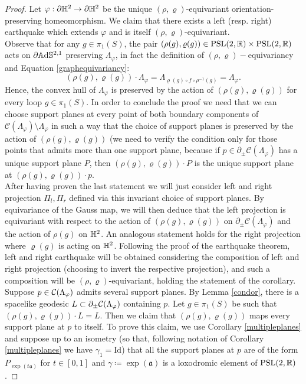 \begin{proof}
    Let $\varphi:\partial\mathbb{H}^2\to\partial\mathbb{H}^2$ be the unique $(\rho,\varrho)$-equivariant orientation-preserving homeomorphism. We claim that there exists a left (resp. right) earthquake which extends $\varphi$ and is itself $(\rho,\varrho)$-equivariant. \\
    Observe that for any $g\in \pi_1(S)$, the pair $(\rho(g),\varrho(g))\in \text{PSL}(2,\mathbb{R})\times\text{PSL}(2,\mathbb{R})$ acts on $\partial\mathbb{A}\mathrm{d}\mathbb{S}^{2,1}$ preserving $\Lambda_\varphi$, in fact the definition of $(\rho,\varrho)-$equivariancy and Equation \ref{graphequivariancy}: 
    \[
        (\rho(g),\varrho(g))\cdot\Lambda_\varphi=\Lambda_{\varrho(g)\circ f\circ \rho^{-1}(g)}=\Lambda_\varphi.
    \]  
    Hence, the convex hull of $\Lambda_\varphi$ is preserved by the action of $(\rho(g),\varrho(g))$ for every loop $g\in\pi_1(S)$. In order to conclude the proof we need that we can choose support planes at every point of both boundary components of $\mathcal{C}(\Lambda_\varphi)\setminus \Lambda_\varphi$ in such a way that the choice of support planes is preserved by the action of $(\rho(g),\varrho(g))$ (we need to verify the condition only for those points that admits more than one support plane, because if $p\in\partial_\pm\mathcal{C}(\Lambda_\varphi)$ has a unique support plane $P$, then $(\rho(g),\varrho(g))\cdot P$ is the unique support plane at $(\rho(g),\varrho(g))\cdot p$.  \\
    After having proven the last statement we will just consider left and right projection $\Pi_l, \Pi_r$ defined via this invariant choice of support planes. By equivariance of the Gauss map, we will then deduce that the left projection is equivariant with respect to the action of $(\rho(g),\varrho(g))$ on $\partial_\pm\mathcal{C}(\Lambda_\varphi)$ and the action of $\rho(g)$ on $\mathbb{H}^2$. An analogous statement holds for the right projection where $\varrho(g)$ is acting on $\mathbb{H}^2$. Following the proof of the earthquake theorem, left and right earthquake will be obtained considering the composition of left and right projection (choosing to invert the respective projection), and such a composition will be $(\rho,\varrho)$-equivariant, holding the statement of the corollary. \\
    Suppose $p\in\mathcal{C}(\Lambda_\varphi)$ admits several support planes. By Lemma \ref{condor}, there is a spacelike geodesic $L\subset \partial_\pm\mathcal{C}(\Lambda_\varphi)$ containing $p$. Let $g\in \pi_1(S)$ be such that $(\rho(g),\varrho(g))\cdot L=L.$ Then we claim that $(\rho(g),\varrho(g))$ maps every support plane at $p$ to itself. To prove this claim, we use Corollary \ref{multipleplanes} and suppose up to an isometry (so that, following notation of Corollary \ref{multipleplanes} we have $\gamma_1=\text{Id}$) that all the support planes at $p$ are of the form $P_{\exp(t\mathfrak{a})}$ for $t\in[0,1]$ and $\gamma\coloneqq \exp(\mathfrak{a})$ is a loxodromic element of $\text{PSL}(2,\mathbb{R})$.

\end{proof}
